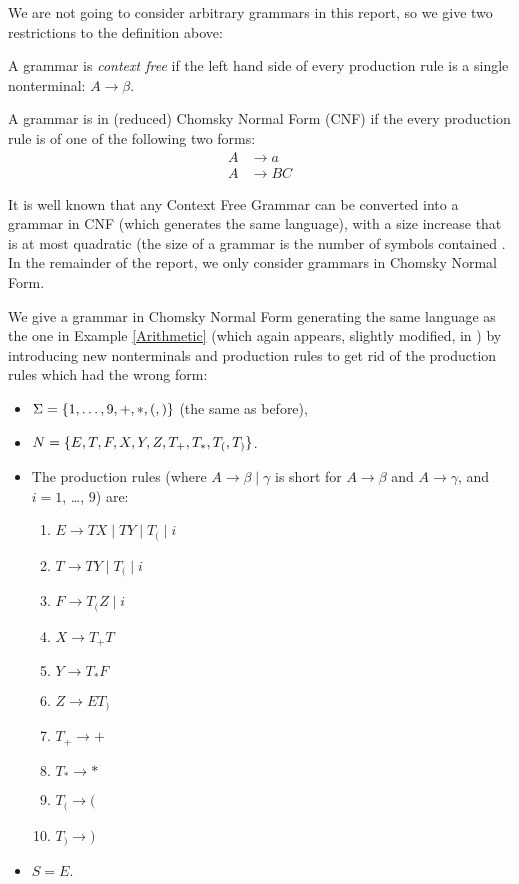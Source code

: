 We are not going to consider arbitrary grammars in this report, so we give two restrictions to the definition above: 
\begin{Definition}
  A grammar is \emph{context free} if the left hand side of every production rule is a single nonterminal: $A \to \beta$.
\end{Definition}
\begin{Definition}
  A grammar is in (reduced) Chomsky Normal Form (CNF) \cite{Chomsky} if the every production rule is of one of the following two forms:
  \begin{align*}
  A &\to a\\
  A &\to BC 
  \end{align*}
\end{Definition}
It is well known that any Context Free Grammar can be converted into a grammar in CNF (which generates the same language), with a size increase that is at most quadratic (the size of a grammar is the number of symbols contained \cite{Lange-Leiss}.
In the remainder of the report, we only consider grammars in Chomsky Normal Form.
\begin{Example}
  \label{CNF-Ex}
  We give a grammar in Chomsky Normal Form generating the same language as the one in Example \ref{Arithmetic} (which again appears, slightly modified, in \cite{Lange-Leiss}) by introducing new nonterminals and production rules to get rid of the production rules which had the wrong form:
  \begin{itemize}
  \item $\Sigma = \{1,\ldots , 9, +, *, (, )\}$ (the same as before),
  \item $N = \{E, T, F, X, Y, Z, T_+, T_*, T_(, T_)\}$.
  \item The production rules (where $A \to \beta \mid \gamma$ is short for $A \to \beta$ and $A \to \gamma$, and $i = 1$, \ldots,  $9$) are:
    \begin{enumerate}
    \item $E \to TX \mid TY \mid T_( \mid i$
    \item $T \to TY \mid T_( \mid i$
    \item $F \to T_(Z \mid i$
    \item $X \to T_+T$ 
    \item $Y \to T_*F$
    \item $Z \to ET_)$
    \item $T_+ \to +$
    \item $T_* \to *$
    \item $T_( \to ($
    \item $T_) \to )$
    \end{enumerate}    
  \item $S = E$.
  \end{itemize}
\end{Example}

